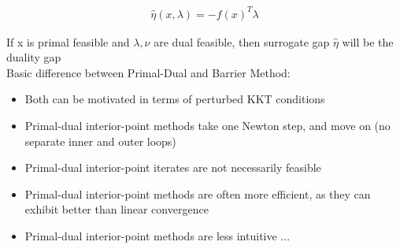 \documentclass[fleqn]{article}
\begin{document}
\begin{align*}
\hat{\eta}(x, \lambda) = -f(x)^T \lambda
\end{align*}

If x is primal feasible and $\lambda, \nu$ are dual feasible, then surrogate gap $\hat{\eta}$ will be the duality gap
\\
Basic difference between Primal-Dual and Barrier Method:
\begin{itemize}
\item Both can be motivated in terms of perturbed KKT conditions

\item Primal-dual interior-point methods take one Newton step, and
move on (no separate inner and outer loops)

\item Primal-dual interior-point iterates are not necessarily feasible

\item Primal-dual interior-point methods are often more efficient, as they can exhibit better than linear convergence

\item Primal-dual interior-point methods are less intuitive ...
\end{itemize}
\end{document}
